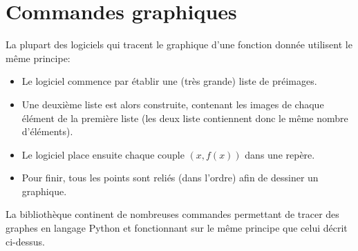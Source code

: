 \section{Commandes graphiques}
La plupart des logiciels qui tracent le graphique d'une fonction donnée utilisent le même principe: 
\begin{itemize}[itemsep=0mm]
\item Le logiciel commence par établir une (très grande) liste de préimages.
\item Une deuxième liste est alors construite, contenant les images de chaque élément de la première liste (les deux liste contiennent donc le même nombre d'éléments).
\item Le logiciel place ensuite chaque couple $(x,f(x))$ dans une repère.
\item Pour finir, tous les points sont reliés (dans l'ordre) afin de dessiner un graphique.
\end{itemize}

La bibliothèque  continent de nombreuses commandes permettant de tracer des graphes en langage Python et fonctionnant sur le même principe que celui décrit ci-dessus.



